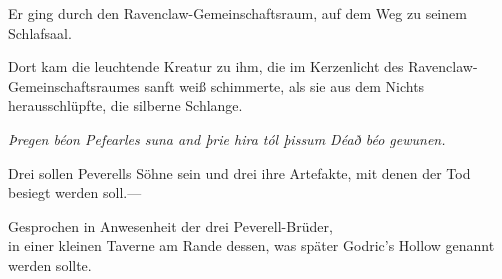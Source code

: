 Er ging durch den Ravenclaw-Gemeinschaftsraum, auf dem Weg zu seinem Schlafsaal.

Dort kam die leuchtende Kreatur zu ihm, die im Kerzenlicht des Ravenclaw-Gemeinschaftsraumes sanft weiß schimmerte, als sie aus dem Nichts herausschlüpfte, die silberne Schlange.

\later

\begin{center}
\emph{Þregen béon Pefearles suna and þrie hira tól þissum Déað béo gewunen.}

Drei sollen Peverells Söhne sein und drei ihre Artefakte, mit denen der Tod besiegt werden soll.—

Gesprochen in Anwesenheit der drei Peverell-Brüder,\\
in einer kleinen Taverne am Rande dessen, was später Godric’s Hollow genannt werden sollte.
\end{center}

